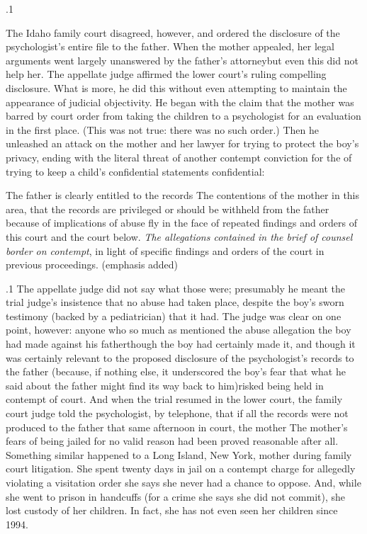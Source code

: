 \documentclass[11pt, twoside]{article}
\begin{document}
{\p.1{%
The Idaho family court disagreed, however, and ordered the disclosure of the psychologist’s entire file to the father. When the mother
appealed, her legal arguments went largely unanswered by the father’s
attorney\mdash{}but even this did not help her.
The appellate judge affirmed the lower court’s ruling compelling disclosure. What is more, he did this without even attempting to maintain
the appearance of judicial objectivity. He began with the claim that the
mother was barred by court order from taking the children to a psychologist for an evaluation in the first place. (This was not true: there was no
such order.) Then he unleashed an attack on the mother and her lawyer
for trying to protect the boy’s privacy, ending with the literal threat of
another contempt conviction for the  of trying to keep a child’s
confidential statements confidential:

\begin{blockQuote}
The father is clearly entitled to the records\ellFour{2pt}{2pt} The contentions of
the mother in this area, that the records are privileged or should
be withheld from the father because of implications of abuse fly
in the face of repeated findings and orders of this court and the
court below. \textit{The allegations contained in the brief of counsel border
on contempt}, in light of specific findings and orders of the court in
previous proceedings. (emphasis added)
\end{blockQuote}

}%

\p.1{%
The appellate judge did not say what those  were; presumably he meant the trial judge’s insistence that no
abuse had taken place, despite the boy’s sworn testimony (backed by
a pediatrician) that it had. The judge was clear on one point, however:
anyone who so much as mentioned the abuse allegation the boy had
made against his father\mdash{}though the boy had certainly made it, and
though it was certainly relevant to the proposed disclosure of the psychologist’s records to the father (because, if nothing else, it underscored
the boy’s fear that what he said about the father might find its way back
to him)\mdash{}risked being held in contempt of court.
And when the trial resumed in the lower court, the family court judge
told the psychologist, by telephone, that if all the records were not produced to the father that same afternoon in court, the mother  The mother’s fears
of being jailed for no valid reason had been proved reasonable after all.
Something similar happened to a Long Island, New York, mother during family court litigation. She spent twenty days in jail on a contempt
charge for allegedly violating a visitation order she says she never had
a chance to oppose. And, while she went to prison in handcuffs (for a
crime she says she did not commit), she lost custody of her children. In
fact, she has not even seen her children since 1994.
}%

}
\end{document}
